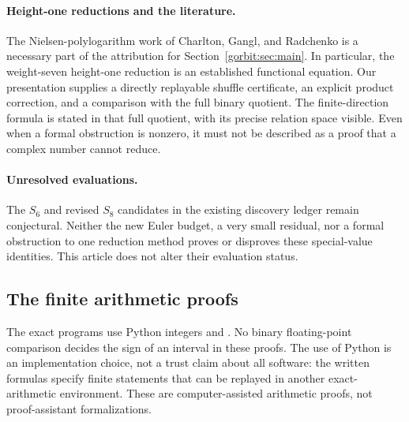 \paragraph{Height-one reductions and the literature.}
The Nielsen-polylogarithm work of Charlton, Gangl, and Radchenko
is a necessary part of the attribution for
Section~\ref{gorbit:sec:main}. In particular, the weight-seven
height-one reduction is an established functional equation.
Our presentation supplies a directly replayable shuffle
certificate, an explicit product correction, and a comparison
with the full binary quotient. The finite-direction formula
is stated in that full quotient, with its precise relation
space visible. Even when a formal obstruction is nonzero,
it must not be described as a proof that a complex number
cannot reduce.

\paragraph{Unresolved evaluations.}
The $S_6$ and revised $S_8$ candidates in the existing discovery
ledger remain conjectural. Neither the new Euler budget, a very
small residual, nor a formal obstruction to one reduction method
proves or disproves these special-value identities. This article
does not alter their evaluation status.

\subsection{The finite arithmetic proofs}

The exact programs use Python integers and
. No binary floating-point comparison
decides the sign of an interval in these proofs. The use of
Python is an implementation choice, not a trust claim about
all software: the written formulas specify finite statements
that can be replayed in another exact-arithmetic environment.
These are computer-assisted arithmetic proofs, not
proof-assistant formalizations.

